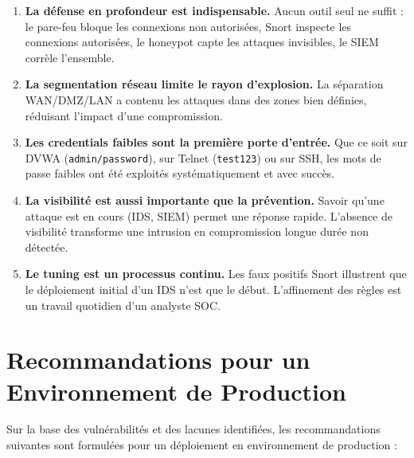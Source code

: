 \documentclass[12pt,a4paper,openany]{report}
\begin{document}
\begin{enumerate}
    \item \textbf{La défense en profondeur est indispensable.} Aucun outil seul ne suffit :
          le pare-feu bloque les connexions non autorisées, Snort inspecte les connexions autorisées,
          le honeypot capte les attaques invisibles, le SIEM corrèle l'ensemble.

    \item \textbf{La segmentation réseau limite le rayon d'explosion.} La séparation WAN/DMZ/LAN
          a contenu les attaques dans des zones bien définies, réduisant l'impact d'une compromission.

    \item \textbf{Les credentials faibles sont la première porte d'entrée.} Que ce soit sur DVWA
          (\texttt{admin/password}), sur Telnet (\texttt{test123}) ou sur SSH, les mots de passe
          faibles ont été exploités systématiquement et avec succès.

    \item \textbf{La visibilité est aussi importante que la prévention.} Savoir qu'une attaque
          est en cours (IDS, SIEM) permet une réponse rapide. L'absence de visibilité transforme
          une intrusion en compromission longue durée non détectée.

    \item \textbf{Le tuning est un processus continu.} Les faux positifs Snort illustrent que
          le déploiement initial d'un IDS n'est que le début. L'affinement des règles est un
          travail quotidien d'un analyste SOC.
\end{enumerate}

\section*{Recommandations pour un Environnement de Production}

Sur la base des vulnérabilités et des lacunes identifiées, les recommandations suivantes sont
formulées pour un déploiement en environnement de production :
\end{document}
